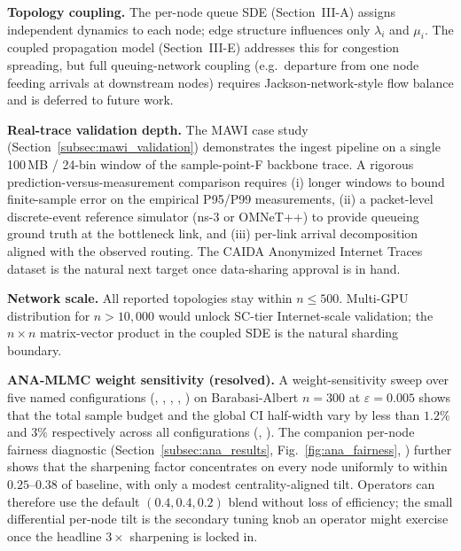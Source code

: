 \documentclass{ieeeaccess}
\begin{document}
\par\textbf{Topology coupling.} The per-node queue SDE (Section~III-A) assigns independent
dynamics to each node; edge structure influences only $\lambda_i$ and $\mu_i$. The coupled
propagation model (Section~III-E) addresses this for congestion spreading, but full
queuing-network coupling (e.g.\ departure from one node feeding arrivals at downstream nodes)
requires Jackson-network-style flow balance and is deferred to future work.

\par\textbf{Real-trace validation depth.} The MAWI case study
(Section~\ref{subsec:mawi_validation}) demonstrates the ingest pipeline on a single 100\,MB /
24-bin window of the sample-point-F backbone trace. A rigorous prediction-versus-measurement
comparison requires (i) longer windows to bound finite-sample error on the empirical P95/P99
measurements, (ii) a packet-level discrete-event reference simulator (ns-3 or OMNeT++) to
provide queueing ground truth at the bottleneck link, and (iii) per-link arrival decomposition
aligned with the observed routing. The CAIDA Anonymized Internet Traces dataset is the natural
next target once data-sharing approval is in hand.

\par\textbf{Network scale.} All reported topologies stay within $n\le500$. Multi-GPU distribution
for $n>10{,}000$ would unlock SC-tier Internet-scale validation; the $n\times n$ matrix-vector
product in the coupled SDE is the natural sharding boundary.

\par\textbf{ANA-MLMC weight sensitivity (resolved).} A weight-sensitivity sweep over five named
configurations (, , ,
, ) on Barabasi-Albert $n=300$ at $\varepsilon=0.005$ shows
that the total sample budget and the global CI half-width vary by less than $1.2\%$ and $3\%$
respectively across all configurations (,
). The companion per-node fairness
diagnostic (Section~\ref{subsec:ana_results}, Fig.~\ref{fig:ana_fairness},
) further shows that the sharpening factor concentrates
on every node uniformly to within $0.25$--$0.38$ of baseline, with only a modest
centrality-aligned tilt. Operators can therefore use the default $(0.4,0.4,0.2)$ blend without
loss of efficiency; the small differential per-node tilt is the secondary tuning knob an operator
might exercise once the headline $3\!\times$ sharpening is locked in.
\end{document}
